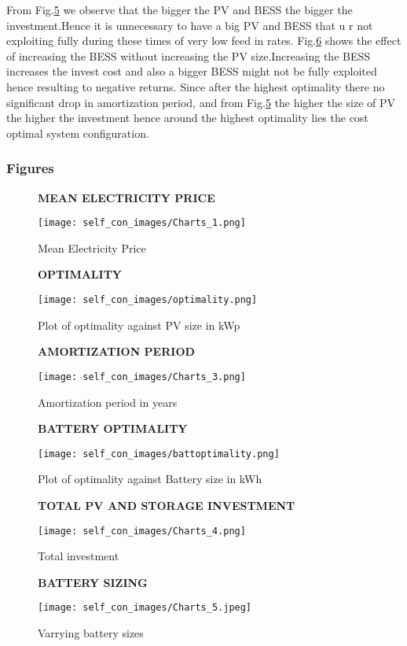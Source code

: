 \documentclass[sigconf,12pt,nonacm]{acmart}
\begin{document}
From Fig.\ref{fig:totalInvestment} we observe that the bigger the PV and BESS the bigger the investment.Hence it is unnecessary to have a big PV and BESS that u r not exploiting fully during these times of very low feed in rates.
Fig.\ref{fig:batt} shows the effect of increasing the BESS without increasing the PV size.Increasing the BESS increases the invest cost and also a bigger BESS might not be fully exploited hence resulting to negative returns.
Since after the highest optimality there no significant drop in amortization period, and from Fig.\ref{fig:totalInvestment} the higher the size of PV the higher the investment  hence around the highest optimality lies the cost optimal system configuration. 
\subsubsection*{Figures}

\begin{figure}
 \textbf{MEAN ELECTRICITY PRICE}\par\medskip
 \texttt{[image: self\_con\_images/Charts\_1.png]}
 \caption{Mean Electricity Price }
 \label{fig:meanElectric}
\end{figure}

\begin{figure}
 \textbf{OPTIMALITY}\par\medskip
 \texttt{[image: self\_con\_images/optimality.png]}
 \caption{Plot of optimality against PV size in kWp}
 \label{fig:optimality}
\end{figure}

\begin{figure}
 \textbf{AMORTIZATION PERIOD}\par\medskip
 \texttt{[image: self\_con\_images/Charts\_3.png]}
 \caption{Amortization period in years  }
 \label{fig:amortizationPerioD}
\end{figure}

\begin{figure}
 \textbf{BATTERY OPTIMALITY}\par\medskip
 \texttt{[image: self\_con\_images/battoptimality.png]}
 \caption{Plot of optimality against Battery size in kWh  }
 \label{fig:battoptimality}
\end{figure}

\begin{figure}
 \textbf{TOTAL PV AND STORAGE INVESTMENT}\par\medskip
 \texttt{[image: self\_con\_images/Charts\_4.png]}
 \caption{Total investment}
 \label{fig:totalInvestment}
\end{figure}
\begin{figure}
 \textbf{BATTERY SIZING}\par\medskip 
 \texttt{[image: self\_con\_images/Charts\_5.jpeg]}
 \caption{Varrying battery sizes}
 \label{fig:batt}
\end{figure}
\end{document}
